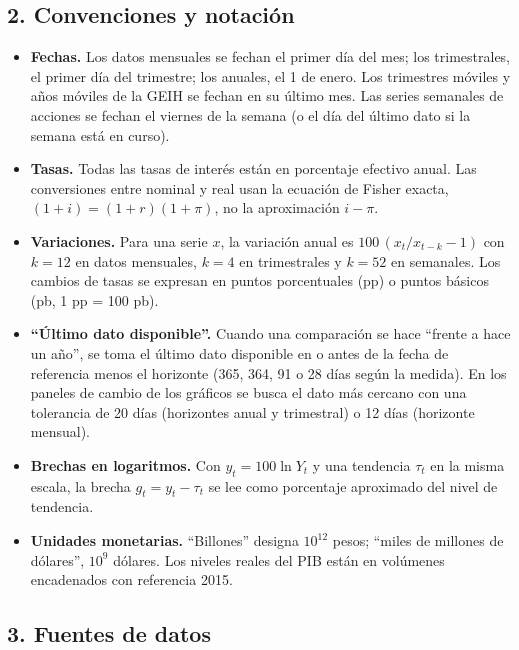 \hypertarget{convenciones-y-notaciuxf3n}{%
\subsection{2. Convenciones y
notación}\label{convenciones-y-notaciuxf3n}}

\begin{itemize}
\tightlist
\item
  \textbf{Fechas.} Los datos mensuales se fechan el primer día del mes;
  los trimestrales, el primer día del trimestre; los anuales, el 1 de
  enero. Los trimestres móviles y años móviles de la GEIH se fechan en
  su último mes. Las series semanales de acciones se fechan el viernes
  de la semana (o el día del último dato si la semana está en curso).
\item
  \textbf{Tasas.} Todas las tasas de interés están en porcentaje
  efectivo anual. Las conversiones entre nominal y real usan la ecuación
  de Fisher exacta, \((1+i) = (1+r)(1+\pi)\), no la aproximación
  \(i-\pi\).
\item
  \textbf{Variaciones.} Para una serie \(x\), la variación anual es
  \(100\,(x_t/x_{t-k}-1)\) con \(k=12\) en datos mensuales, \(k=4\) en
  trimestrales y \(k=52\) en semanales. Los cambios de tasas se expresan
  en puntos porcentuales (pp) o puntos básicos (pb, 1 pp = 100 pb).
\item
  \textbf{``Último dato disponible''.} Cuando una comparación se hace
  ``frente a hace un año'', se toma el último dato disponible en o antes
  de la fecha de referencia menos el horizonte (365, 364, 91 o 28 días
  según la medida). En los paneles de cambio de los gráficos se busca el
  dato más cercano con una tolerancia de 20 días (horizontes anual y
  trimestral) o 12 días (horizonte mensual).
\item
  \textbf{Brechas en logaritmos.} Con \(y_t = 100\ln Y_t\) y una
  tendencia \(\tau_t\) en la misma escala, la brecha
  \(g_t = y_t - \tau_t\) se lee como porcentaje aproximado del nivel de
  tendencia.
\item
  \textbf{Unidades monetarias.} ``Billones'' designa \(10^{12}\) pesos;
  ``miles de millones de dólares'', \(10^{9}\) dólares. Los niveles
  reales del PIB están en volúmenes encadenados con referencia 2015.
\end{itemize}

\hypertarget{fuentes-de-datos}{%
\subsection{3. Fuentes de datos}\label{fuentes-de-datos}}


